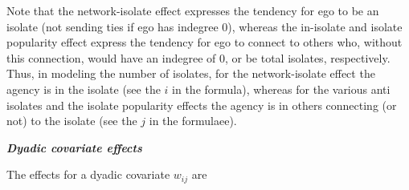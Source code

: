 \documentclass[a4paper,fleqn,11pt]{article}
\newcommand{\+}{\, + \,}
\begin{document}
      Note that the network-isolate effect expresses the tendency for ego
      to be an isolate (not sending ties if ego has indegree 0),
      whereas the in-isolate and
      isolate popularity effect express the tendency for ego
      to connect to others who, without this connection, would
      have an indegree of 0, or be total isolates, respectively.
      Thus, in modeling the number of isolates, for the network-isolate
      effect the agency is in the isolate (see the $i$ in the formula),
      whereas for the various anti isolates and the isolate popularity
      effects the agency is in others connecting (or not)
      to the isolate (see the $j$ in the formulaee).
\medskip

\noindent
\textbf{\emph{Dyadic covariate effects}}
\medskip

\noindent
The effects for a dyadic covariate $w_{ij}$ are
\end{document}
